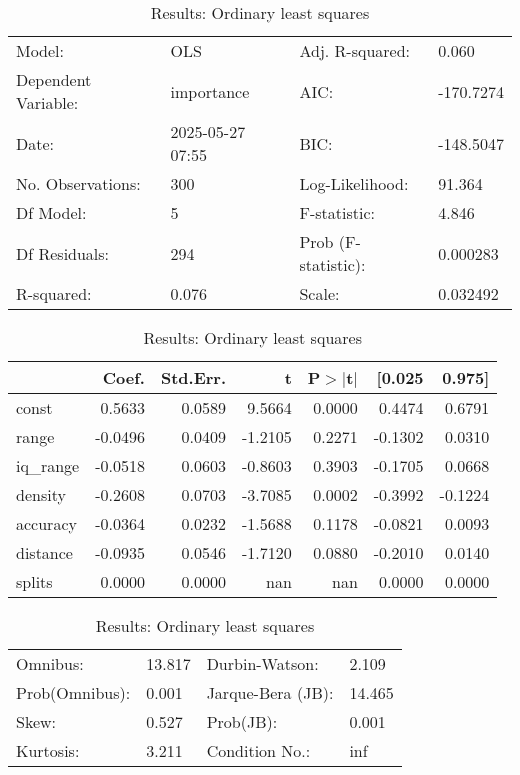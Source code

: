 \begin{table}
\caption{Results: Ordinary least squares}
\label{}
\begin{center}
\begin{tabular}{llll}
\hline
Model:              & OLS              & Adj. R-squared:     & 0.060      \\
Dependent Variable: & importance       & AIC:                & -170.7274  \\
Date:               & 2025-05-27 07:55 & BIC:                & -148.5047  \\
No. Observations:   & 300              & Log-Likelihood:     & 91.364     \\
Df Model:           & 5                & F-statistic:        & 4.846      \\
Df Residuals:       & 294              & Prob (F-statistic): & 0.000283   \\
R-squared:          & 0.076            & Scale:              & 0.032492   \\
\hline
\end{tabular}
\end{center}

\begin{center}
\begin{tabular}{lrrrrrr}
\hline
          &   Coef. & Std.Err. &       t & P$> |$t$|$ &  [0.025 &  0.975]  \\
\hline
const     &  0.5633 &   0.0589 &  9.5664 &      0.0000 &  0.4474 &  0.6791  \\
range     & -0.0496 &   0.0409 & -1.2105 &      0.2271 & -0.1302 &  0.0310  \\
iq\_range & -0.0518 &   0.0603 & -0.8603 &      0.3903 & -0.1705 &  0.0668  \\
density   & -0.2608 &   0.0703 & -3.7085 &      0.0002 & -0.3992 & -0.1224  \\
accuracy  & -0.0364 &   0.0232 & -1.5688 &      0.1178 & -0.0821 &  0.0093  \\
distance  & -0.0935 &   0.0546 & -1.7120 &      0.0880 & -0.2010 &  0.0140  \\
splits    &  0.0000 &   0.0000 &     nan &         nan &  0.0000 &  0.0000  \\
\hline
\end{tabular}
\end{center}

\begin{center}
\begin{tabular}{llll}
\hline
Omnibus:       & 13.817 & Durbin-Watson:    & 2.109   \\
Prob(Omnibus): & 0.001  & Jarque-Bera (JB): & 14.465  \\
Skew:          & 0.527  & Prob(JB):         & 0.001   \\
Kurtosis:      & 3.211  & Condition No.:    & inf     \\
\hline
\end{tabular}
\end{center}
\end{table}
